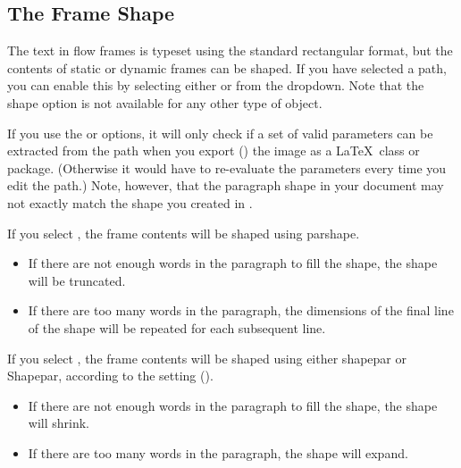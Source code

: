 \subsection{The Frame Shape}\label{sec:frameshape}

The text in flow frames is typeset using the standard rectangular
format, but the contents of static or dynamic frames can be shaped. If you
have selected a \gls{path}, you can enable
this by selecting either 
or  from the
 \gls*{dropdown}. Note that the
shape option is not available for any other type of \gls{object}.
  
If you use the 
or  options, it will only
check if a set of valid parameters can be extracted from the
\gls*{path} when you export () the image as a \LaTeX\
class or package. (Otherwise it would have to re-evaluate the
parameters every time you edit the path.) Note, however, that the
paragraph shape in your document may not exactly match the shape you
created in \FlowframTk.


If you select , the frame contents
will be shaped using \gls{parshape}.

\begin{itemize}
\item If there are not enough words in the paragraph to fill the
shape, the shape will be truncated.
\item If there are too many words in the paragraph, the dimensions
of the final line of the shape will be repeated for each
subsequent line.
\end{itemize}


If you select , the frame contents
will be shaped using either \gls{shapepar} or \gls{Shapepar},
according to the  setting
().

\begin{itemize}
\item If there are not enough words in the paragraph to fill the 
shape, the shape will shrink.
\item If there are too many words in the paragraph, the shape
will expand.
\end{itemize}

